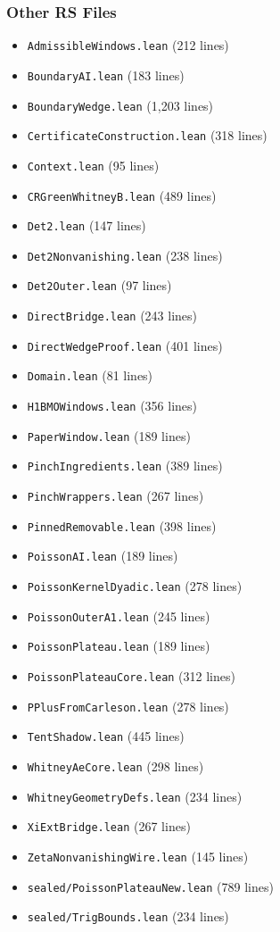 \documentclass[12pt,a4paper]{article}
\begin{document}
\subsubsection{Other RS Files}
\begin{itemize}
    \item \texttt{AdmissibleWindows.lean} (212 lines)
    \item \texttt{BoundaryAI.lean} (183 lines)
    \item \texttt{BoundaryWedge.lean} (1,203 lines)
    \item \texttt{CertificateConstruction.lean} (318 lines)
    \item \texttt{Context.lean} (95 lines)
    \item \texttt{CRGreenWhitneyB.lean} (489 lines)
    \item \texttt{Det2.lean} (147 lines)
    \item \texttt{Det2Nonvanishing.lean} (238 lines)
    \item \texttt{Det2Outer.lean} (97 lines)
    \item \texttt{DirectBridge.lean} (243 lines)
    \item \texttt{DirectWedgeProof.lean} (401 lines)
    \item \texttt{Domain.lean} (81 lines)
    \item \texttt{H1BMOWindows.lean} (356 lines)
    \item \texttt{PaperWindow.lean} (189 lines)
    \item \texttt{PinchIngredients.lean} (389 lines)
    \item \texttt{PinchWrappers.lean} (267 lines)
    \item \texttt{PinnedRemovable.lean} (398 lines)
    \item \texttt{PoissonAI.lean} (189 lines)
    \item \texttt{PoissonKernelDyadic.lean} (278 lines)
    \item \texttt{PoissonOuterA1.lean} (245 lines)
    \item \texttt{PoissonPlateau.lean} (189 lines)
    \item \texttt{PoissonPlateauCore.lean} (312 lines)
    \item \texttt{PPlusFromCarleson.lean} (278 lines)
    \item \texttt{TentShadow.lean} (445 lines)
    \item \texttt{WhitneyAeCore.lean} (298 lines)
    \item \texttt{WhitneyGeometryDefs.lean} (234 lines)
    \item \texttt{XiExtBridge.lean} (267 lines)
    \item \texttt{ZetaNonvanishingWire.lean} (145 lines)
    \item \texttt{sealed/PoissonPlateauNew.lean} (789 lines)
    \item \texttt{sealed/TrigBounds.lean} (234 lines)
\end{itemize}
\end{document}
